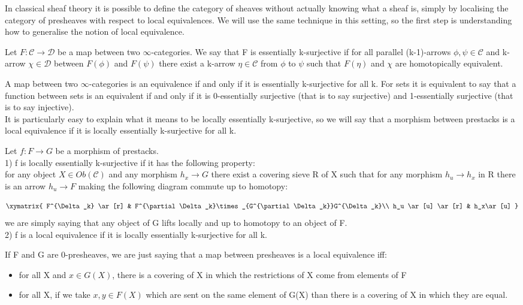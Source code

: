 In classical sheaf theory it is possible to define the category of sheaves without actually knowing what a sheaf is, simply by localising the category of
presheaves with respect to local equivalences. We will use the same technique in this setting, so the first step is understanding how to generalise the
notion of local equivalence.\\
\begin{defin}
Let $F:\mathcal C\to\mathcal D$ be a map between two $\infty$-categories. We say that F is essentially k-surjective if for all parallel (k-1)-arrows $\phi,\psi\in \mathcal C$ and k-arrow $\chi \in \mathcal D$
between $F(\phi)$ and $F(\psi)$ there exist a k-arrow $\eta\in\mathcal C$ from $\phi$ to $\psi$ such that $F(\eta)$ and $\chi$ are homotopically equivalent.
\end{defin}
A map between two $\infty$-categories is an equivalence if and only if it is essentially k-surjective for all k. For sets it is equivalent to say that a function
between sets is an equivalent if and only if it is 0-essentially surjective (that is to say surjective) and 1-essentially surjective (that is to say injective).\\
It is particularly easy to explain what it means to be locally essentially k-surjective, so we will say that a morphism between prestacks is a local equivalence
if it is locally essentially k-surjective for all k.

\begin{defin}
Let $f: F\to G$ be a morphism of prestacks.\\
1) f is locally essentially k-surjective if it has the following property:\\
for any object $X\in Ob(\mathcal C)$ and any morphism $h_x\to G$ there exist a covering sieve R of X such that for any morphism $h_u\to h_x$ in R there is an arrow
$h_u\to F$ making the following diagram commute up to homotopy:

\begin{displaymath}
\xymatrix{
F^{\Delta_k} \ar[r] &  F^{\partial\Delta_k}\times_{G^{\partial\Delta_k}}G^{\Delta_k}\\
 h_u \ar[u] \ar[r] & h_x\ar[u]
}
\end{displaymath}
we are simply saying that any object of G lifts locally and up to homotopy to an object of F.\\
2) f is a local equivalence if it is locally essentially k-surjective for all k.
\end{defin}

\begin{rmk}
If F and G are 0-presheaves, we are just saying that a map between presheaves is a local equivalence iff:
\begin{itemize}
 \item for all X and $x\in G(X)$, there is a covering of X in which the restrictions of X come from elements of F
\item for all X, if we take $x,y\in F(X)$ which are sent on the same element of G(X) than there is a covering of X in which they are equal.
\end{itemize}

\end{rmk}

